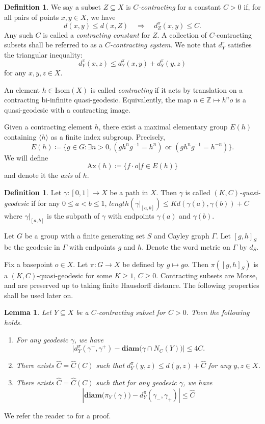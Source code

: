 \documentclass{amsart}
\numberwithin{thm}{section}
\numberwithin{figure}{section}
\newtheorem{lem}[thm]{Lemma}
\theoremstyle{definition}
\theoremstyle{definition}
\newtheorem{defn}[thm]{Definition}
\theoremstyle{remark}
\newcommand{\isom}{\mathrm{Isom}}
\newcommand{\U}{X}
\newcommand{\ax}{\mathrm{Ax}}
\newcommand{\diam }[1]{{\textbf{diam}\big(#1\big)}}
\numberwithin{equation}{section}
\theoremstyle{plain}
\begin{document}
\begin{defn} \label{Def:Contracting}
We say a subset $Z \subseteq X$ is \emph{$C$-contracting} for a constant $C>0$ if,
for all pairs of points $x, y \in X$, we have
\[
d(x, y) \leq d(x, Z) \quad  \Longrightarrow  \quad d_Z^{\pi}(x,y) \leq  C.
\]
Any such $C$ is called a \emph{contracting constant} for $Z$. A collection of $C$-contracting subsets shall be referred to as a \emph{$C$-contracting system}.
We note that $d^{\pi}_Y$ satisfies the triangular inequality: $$d^{\pi}_Y(x, z) \le d^{\pi}_Y(x, y) + d^{\pi}_Y(y, z)$$ for any $x, y, z\in X$.

An element $h\in \isom(\U)$ is called \textit{contracting} if it acts by translation on a contracting bi-infinite quasi-geodesic. Equivalently, the map $n\in \mathbb Z\longmapsto h^no$ is a quasi-geodesic with a contracting image.  
\end{defn}

Given a contracting element $h$, there exist a maximal elementary group $E(h)$ containing $\langle h \rangle$ as a finite index subgroup. Precisely,
\[
E(h) \coloneqq \{ g \in G : \exists n >0, (gh^ng^{-1}=h^n) \mbox{ or } (gh^ng^{-1}=h^{-n})  \}.
\]
We will define
\[
\ax(h) \coloneqq \{ f \cdot o | f \in E(h) \}
\]
and denote it the \emph{axis} of $h$.

\begin{defn}
	Let $\gamma: [0, 1]\to X$ be a path in $X$. Then $\gamma$ is called {\it $(K, C)$-quasi-geodesic} if for any $0\le a < b \le 1$, $length(\gamma|_{[a,b]})\le K d(\gamma(a), \gamma(b)) + C$ where $\gamma|_{[a,b]}$ is the subpath of $\gamma$ with endpoints $\gamma(a)$ and $\gamma(b)$.
\end{defn}
Let $G$ be a group with a finite generating set $S$ and Cayley graph $\Gamma$. Let $[g, h]_S$ be the geodesic in $\Gamma$ with endpoints $g$ and $h$. Denote the word metric on $\Gamma$ by $d_S$.

Fix a basepoint $o\in X$. Let $\pi: G\to X$ be defined by $g\mapsto go$. Then $\pi([g, h]_S)$ is a $(K, C)$-quasi-geodesic for some $K\ge 1$, $C\ge 0$.
Contracting subsets are Morse, and are preserved up to taking finite Hausdorff distance. The following properties shall be used later on.
\begin{lem}\label{BigFive}
	Let $Y\subseteq \U$ be a  $C$-contracting subset for $C>0$. Then the following holds.
	
	\begin{enumerate}
		\item
		For any  geodesic $\gamma$, we have $$\big |d^{\pi}_Y(\gamma^-,\gamma^+)- \diam{\gamma\cap N_C(Y)}\big|\leq 4C.$$
		
		\item
		There exists $\hat C=\hat C(C)$ such that   $d^{\pi}_Y(y, z)\le d(y, z)+\hat C$ for any $y,z\in \U$.
		
		\item 
		There exists $\hat C=\hat C(C)$ such that for any geodesic $\gamma$, we have $$\left| \diam{\pi_Y(\gamma)} - d^{\pi}_Y(\gamma_-, \gamma_+) \right| \leq \hat C$$
		
	\end{enumerate}
\end{lem}
We refer the reader to \cite{Yang:PS&growth} for a proof.
\end{document}
